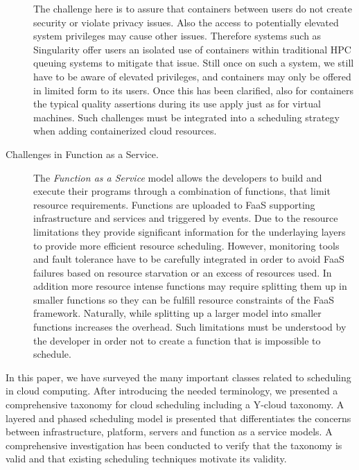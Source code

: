 \documentclass[final,5p,times,twocolumn]{elsarticle}
\begin{document}
\begin{description}
  The challenge here is to assure that containers between users do not
  create security or violate privacy issues. Also the access to
  potentially elevated system privileges may cause other issues.
  Therefore systems such as Singularity offer users an isolated use of
  containers within traditional HPC queuing systems to mitigate that
  issue. Still once on such a system, we still have to be aware of
  elevated privileges, and containers may only be offered in limited
  form to its users. Once this has been clarified, also for containers
  the typical quality assertions during its use apply just as for
  virtual machines. Such challenges must be integrated into a
  scheduling strategy when adding containerized cloud resources.


\item[Challenges in Function as a Service.] The {\em Function as a
    Service} model allows the developers to build and execute their
  programs through a combination of functions, that limit resource
  requirements. Functions are uploaded to FaaS supporting
  infrastructure and services and triggered by events. Due to the
  resource limitations they provide significant information for the
  underlaying layers to provide more efficient resource scheduling.
  However, monitoring tools and fault tolerance have to be carefully
  integrated in order to avoid FaaS failures based on resource
  starvation or an excess of resources used. In addition more resource
  intense functions may require splitting them up in smaller functions
  so they can be fulfill resource constraints of the FaaS
  framework. Naturally, while splitting up a larger model into smaller
  functions increases the overhead.  Such limitations must be
  understood by the developer in order not to create a function that
  is impossible to schedule.

\end{description}

\color{black}

In this paper, we have surveyed the many important classes related to 
scheduling in cloud computing. After introducing the needed
terminology, we presented a comprehensive taxonomy for cloud
scheduling including a Y-cloud taxonomy. A layered and phased
scheduling model is presented that differentiates the concerns between
infrastructure, platform, servers and function as a service models. A
comprehensive investigation has been conducted to verify that the
taxonomy is valid and that existing scheduling techniques motivate its
validity.
\end{document}
